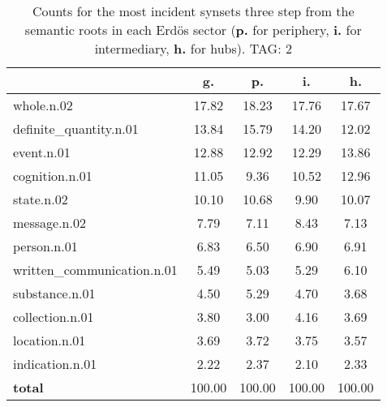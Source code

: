\begin{table}[h!]
\begin{center}
\begin{tabular}{| l | c | c | c | c |}\hline
 & g. & p. & i. & h. \\\hline
whole.n.02 & 17.82  & 18.23  & 17.76  & 17.67 \\\hline
definite\_quantity.n.01 & 13.84  & 15.79  & 14.20  & 12.02 \\\hline
event.n.01 & 12.88  & 12.92  & 12.29  & 13.86 \\\hline
cognition.n.01 & 11.05  & 9.36  & 10.52  & 12.96 \\\hline
state.n.02 & 10.10  & 10.68  & 9.90  & 10.07 \\\hline
message.n.02 & 7.79  & 7.11  & 8.43  & 7.13 \\\hline
person.n.01 & 6.83  & 6.50  & 6.90  & 6.91 \\\hline
written\_communication.n.01 & 5.49  & 5.03  & 5.29  & 6.10 \\\hline
substance.n.01 & 4.50  & 5.29  & 4.70  & 3.68 \\\hline
collection.n.01 & 3.80  & 3.00  & 4.16  & 3.69 \\\hline
location.n.01 & 3.69  & 3.72  & 3.75  & 3.57 \\\hline
indication.n.01 & 2.22  & 2.37  & 2.10  & 2.33 \\\hline
{{\bf total}} & 100.00  & 100.00  & 100.00  & 100.00 \\\hline
\end{tabular}
\caption{Counts for the most incident synsets three step from the semantic roots in each Erd\"os sector ({\bf p.} for periphery, {\bf i.} for intermediary, {\bf h.} for hubs). TAG: 2}
\end{center}
\end{table}